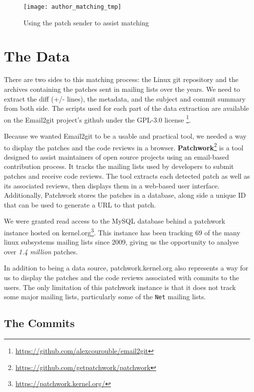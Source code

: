 \begin{figure}[htb]
\centering
\texttt{[image: author\_matching\_tmp]}
\caption{Using the patch sender to assist matching}
\label{fig:author_matching}
\end{figure}


\section{The Data}

There are two sides to this matching process: the Linux git repository and the archives containing the patches sent in mailing lists over the years. We need to extract the diff (+/- lines), the metadata, and the subject and commit summary from both side. The scripts used for each part of the data extraction are available on the Email2git project's github under the GPL-3.0 license \footnote{\url{https://github.com/alexcourouble/email2git}}.

Because we wanted Email2git to be a usable and practical tool, we needed a way to display the patches and the code reviews in a browser. \textbf{Patchwork}\footnote{\url{https://github.com/getpatchwork/patchwork}} is a tool designed to assist maintainers of open source projects using an email-based contribution process. It tracks the mailing lists used by developers to submit patches and receive code reviews. The tool extracts each detected patch as well as its associated reviews, then displays them in a web-based user interface. Additionally, Patchwork stores the patches in a database, along side a unique ID that can be used to generate a URL to that patch.

We were granted read access to the MySQL database behind a patchwork instance hosted on kernel.org\footnote{\url{https://patchwork.kernel.org/}}. This instance has been tracking 69 of the many linux subsystems mailing lists since 2009, giving us the opportunity to analyse over \textit{1.4 million} patches.

In addition to being a data source, patchwork.kernel.org also represents a way for us to display the patches and the code reviews associated with commits to the users. The only limitation of this patchwork instance is that it does not track some major mailing lists, particularly some of the \texttt{Net} mailing lists.


\subsection{The Commits}

